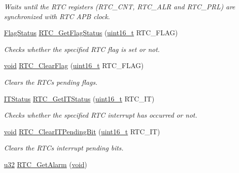 \begin{DoxyCompactItemize}
\begin{DoxyCompactList}\small\item\em Waits until the R\+TC registers (R\+T\+C\+\_\+\+C\+NT, R\+T\+C\+\_\+\+A\+LR and R\+T\+C\+\_\+\+P\+RL) are synchronized with R\+TC A\+PB clock. \end{DoxyCompactList}\item 
\hyperlink{agilefox_2library_2inc_2stm32f10x__type_8h_a89136caac2e14c55151f527ac02daaff}{Flag\+Status} \hyperlink{group___r_t_c___private___functions_ga21a85e5f846cb4552d5e76420779f3f6}{R\+T\+C\+\_\+\+Get\+Flag\+Status} (\hyperlink{_p_e___types_8h_a1f1825b69244eb3ad2c7165ddc99c956}{uint16\+\_\+t} R\+T\+C\+\_\+\+F\+L\+AG)
\begin{DoxyCompactList}\small\item\em Checks whether the specified R\+TC flag is set or not. \end{DoxyCompactList}\item 
\hyperlink{usb__devapi_8h_afabf60e7f57651d6d595a02c75f07cd0}{void} \hyperlink{group___r_t_c___private___functions_gacefb05730a77ffaa273c1ac3ade1a22f}{R\+T\+C\+\_\+\+Clear\+Flag} (\hyperlink{_p_e___types_8h_a1f1825b69244eb3ad2c7165ddc99c956}{uint16\+\_\+t} R\+T\+C\+\_\+\+F\+L\+AG)
\begin{DoxyCompactList}\small\item\em Clears the R\+TC\textquotesingle{}s pending flags. \end{DoxyCompactList}\item 
\hyperlink{agilefox_2library_2inc_2stm32f10x__type_8h_aacbd7ed539db0aacd973a0f6eca34074}{I\+T\+Status} \hyperlink{group___r_t_c___private___functions_ga23274ad8aa28e86d5b0d58eee295db21}{R\+T\+C\+\_\+\+Get\+I\+T\+Status} (\hyperlink{_p_e___types_8h_a1f1825b69244eb3ad2c7165ddc99c956}{uint16\+\_\+t} R\+T\+C\+\_\+\+IT)
\begin{DoxyCompactList}\small\item\em Checks whether the specified R\+TC interrupt has occurred or not. \end{DoxyCompactList}\item 
\hyperlink{usb__devapi_8h_afabf60e7f57651d6d595a02c75f07cd0}{void} \hyperlink{group___r_t_c___private___functions_ga62b9a04d89a11f28db7dcfd50d9ee768}{R\+T\+C\+\_\+\+Clear\+I\+T\+Pending\+Bit} (\hyperlink{_p_e___types_8h_a1f1825b69244eb3ad2c7165ddc99c956}{uint16\+\_\+t} R\+T\+C\+\_\+\+IT)
\begin{DoxyCompactList}\small\item\em Clears the R\+TC\textquotesingle{}s interrupt pending bits. \end{DoxyCompactList}\item 
\hyperlink{agilefox_2library_2inc_2stm32f10x__type_8h_a2caf5cd7bcdbe1eefa727f44ffb10bac}{u32} \hyperlink{iot-lab___a8-_m3_2library_2_s_t_m32_f10x___std_periph___lib___v3_85_80_2_libraries_2_s_t_m32_f105a0fd4b430bdb9a0d6dbe2fc8a623ab2_ab783d977e5de7f270bb8958d68762923}{R\+T\+C\+\_\+\+Get\+Alarm} (\hyperlink{usb__devapi_8h_afabf60e7f57651d6d595a02c75f07cd0}{void})
\end{DoxyCompactItemize}


